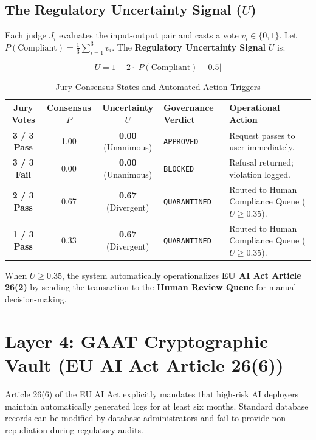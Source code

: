 \documentclass[11pt,a4paper]{article}
\begin{document}
\subsection{The Regulatory Uncertainty Signal ($U$)}
Each judge $J_i$ evaluates the input-output pair and casts a vote $v_i \in \{0, 1\}$.
Let $P(\text{Compliant}) = \frac{1}{3} \sum_{i=1}^3 v_i$. The \textbf{Regulatory Uncertainty Signal} $U$ is:

\begin{equation}
    U = 1 - 2 \cdot \left| P(\text{Compliant}) - 0.5 \right|
\end{equation}

\begin{table}[h]
\caption{Jury Consensus States and Automated Action Triggers}
\label{tab:uncertainty_actions}
\centering
\begin{tabularx}{\textwidth}{@{}ccclX@{}}
\toprule
\textbf{Jury Votes} & \textbf{Consensus $P$} & \textbf{Uncertainty $U$} & \textbf{Governance Verdict} & \textbf{Operational Action} \\ \midrule
\textbf{3 / 3 Pass} & 1.00 & \textbf{0.00} (Unanimous) & \texttt{APPROVED} & Request passes to user immediately. \\
\textbf{3 / 3 Fail} & 0.00 & \textbf{0.00} (Unanimous) & \texttt{BLOCKED} & Refusal returned; violation logged. \\
\textbf{2 / 3 Pass} & 0.67 & \textbf{0.67} (Divergent) & \texttt{QUARANTINED} & Routed to Human Compliance Queue ($U \ge 0.35$). \\
\textbf{1 / 3 Pass} & 0.33 & \textbf{0.67} (Divergent) & \texttt{QUARANTINED} & Routed to Human Compliance Queue ($U \ge 0.35$). \\ \bottomrule
\end{tabularx}
\end{table}

When $U \ge 0.35$, the system automatically operationalizes \textbf{EU AI Act Article 26(2)} by sending the transaction to the \textbf{Human Review Queue} for manual decision-making.

\section{Layer 4: GAAT Cryptographic Vault (EU AI Act Article 26(6))}
\label{sec:layer4}

Article 26(6) of the EU AI Act explicitly mandates that high-risk AI deployers maintain automatically generated logs for at least six months. Standard database records can be modified by database administrators and fail to provide non-repudiation during regulatory audits.
\end{document}

